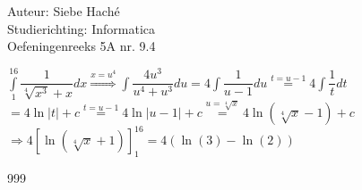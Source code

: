\documentclass[a4paper]{article}
\begin{document}
  
\noindent \large Auteur: Siebe Haché \\
\noindent \large Studierichting: Informatica\\
\noindent \large Oefeningenreeks 5A nr. 9.4\\

\medskip

\normalsize


$ \displaystyle\int \limits_{1}^{16} \dfrac{1}{\sqrt[4]{x^3}+x} dx \stackrel{x=u^4}{\Rightarrow}  \displaystyle\int \dfrac{4u^3}{u^4+u^3} du
= 4\displaystyle\int \dfrac{1}{u - 1}du \stackrel{t = u - 1}{=}  4\displaystyle\int \dfrac{1}{t}dt$\\

$ = 4\ln| t | + c  \stackrel{t = u - 1}{=} 4\ln| u - 1 | + c  \stackrel{u = \sqrt[4]{x}}{=} 4\ln\left( \sqrt[4]{x} - 1 \right) + c$\\
										
$ \Rightarrow 4 \left[\ln\left(\sqrt[4]{x}+1\right) \right]^{16}_1 = 4\left(\ln\left(3\right)-\ln\left(2\right)\right)$\\

\begin{thebibliography}{999}
\end{thebibliography}
\end{document}
